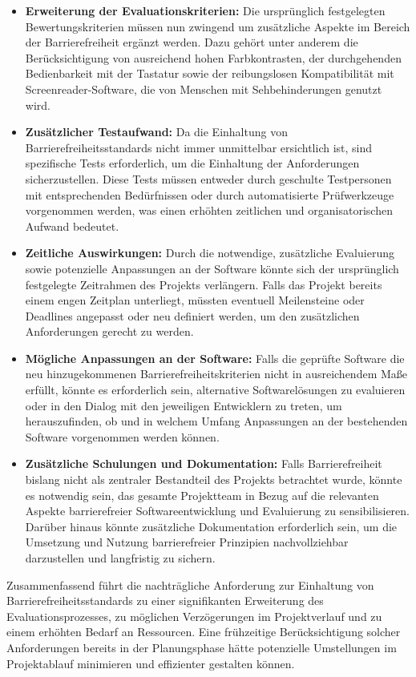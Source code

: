 \documentclass[ThesisDJ.tex]{subfiles}
\begin{document}
\begin{itemize}
    \item \textbf{Erweiterung der Evaluationskriterien:} Die ursprünglich festgelegten Bewertungskriterien müssen nun zwingend um zusätzliche Aspekte im Bereich der Barrierefreiheit ergänzt werden. Dazu gehört unter anderem die Berücksichtigung von ausreichend hohen Farbkontrasten, der durchgehenden Bedienbarkeit mit der Tastatur sowie der reibungslosen Kompatibilität mit Screenreader-Software, die von Menschen mit Sehbehinderungen genutzt wird.
    \item \textbf{Zusätzlicher Testaufwand:} Da die Einhaltung von Barrierefreiheitsstandards nicht immer unmittelbar ersichtlich ist, sind spezifische Tests erforderlich, um die Einhaltung der Anforderungen sicherzustellen. Diese Tests müssen entweder durch geschulte Testpersonen mit entsprechenden Bedürfnissen oder durch automatisierte Prüfwerkzeuge vorgenommen werden, was einen erhöhten zeitlichen und organisatorischen Aufwand bedeutet. 
    \item \textbf{Zeitliche Auswirkungen:} Durch die notwendige, zusätzliche Evaluierung sowie potenzielle Anpassungen an der Software könnte sich der ursprünglich festgelegte Zeitrahmen des Projekts verlängern. Falls das Projekt bereits einem engen Zeitplan unterliegt, müssten eventuell Meilensteine oder Deadlines angepasst oder neu definiert werden, um den zusätzlichen Anforderungen gerecht zu werden.
    \item \textbf{Mögliche Anpassungen an der Software:} Falls die geprüfte Software die neu hinzugekommenen Barrierefreiheitskriterien nicht in ausreichendem Maße erfüllt, könnte es erforderlich sein, alternative Softwarelösungen zu evaluieren oder in den Dialog mit den jeweiligen Entwicklern zu treten, um herauszufinden, ob und in welchem Umfang Anpassungen an der bestehenden Software vorgenommen werden können.
    \item \textbf{Zusätzliche Schulungen und Dokumentation:} Falls Barrierefreiheit bislang nicht als zentraler Bestandteil des Projekts betrachtet wurde, könnte es notwendig sein, das gesamte Projektteam in Bezug auf die relevanten Aspekte barrierefreier Softwareentwicklung und Evaluierung zu sensibilisieren. Darüber hinaus könnte zusätzliche Dokumentation erforderlich sein, um die Umsetzung und Nutzung barrierefreier Prinzipien nachvollziehbar darzustellen und langfristig zu sichern.
\end{itemize}

Zusammenfassend führt die nachträgliche Anforderung zur Einhaltung von Barrierefreiheitsstandards zu einer signifikanten Erweiterung des Evaluationsprozesses, zu möglichen Verzögerungen im Projektverlauf und zu einem erhöhten Bedarf an Ressourcen. Eine frühzeitige Berücksichtigung solcher Anforderungen bereits in der Planungsphase hätte potenzielle Umstellungen im Projektablauf minimieren und effizienter gestalten können.
\end{document}
